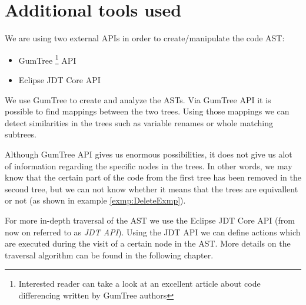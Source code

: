 \section{Additional tools used}
\label{sec:Tools}

We are using two external APIs in order to create/manipulate the code AST:

\begin{itemize}
    \item GumTree \footnote{Interested reader can take a look at an excellent article \cite{DBLP:conf/kbse/FalleriMBMM14} about code differencing written by GumTree authors} API \cite{GumTree}
    \item Eclipse JDT Core API \cite{JDT}
\end{itemize}

We use GumTree to create and analyze the ASTs. Via GumTree API it is possible to find mappings between the two trees. Using those mappings we can detect similarities in the trees such as variable renames or whole matching subtrees.

Although GumTree API gives us enormous possibilities, it does not give us alot of information regarding the specific nodes in the trees. In other words, we may know that the certain part of the code from the first tree has been removed in the second tree, but we can not know whether it means that the trees are equivallent or not (as shown in example \ref{exmp:DeleteExmp}).

For more in-depth traversal of the AST we use the Eclipse JDT Core API (from now on referred to as \emph{JDT API}). Using the JDT API we can define actions which are executed during the visit of a certain node in the AST. More details on the traversal algorithm can be found in the following chapter.

